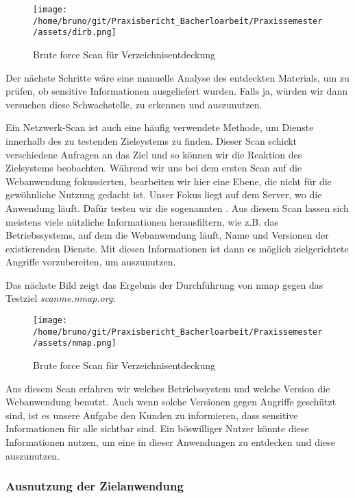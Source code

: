 \begin{figure}[H]
    \centering
    \texttt{[image: /home/bruno/git/Praxisbericht\_Bacherloarbeit/Praxissemester/assets/dirb.png]}
    \caption{Brute force Scan für Verzeichnisentdeckung}
    \centering
\end{figure}

Der nächste Schritte wäre eine manuelle Analyse des entdeckten Materials, um zu prüfen, ob sensitive Informationen ausgeliefert wurden. Falls ja, würden wir dann versuchen diese \gls{Schwachstelle}, zu erkennen und auszunutzen.

Ein Netzwerk-Scan ist auch eine häufig verwendete Methode, um Dienste innerhalb des zu testenden Zielsystems zu finden. Dieser Scan schickt verschiedene Anfragen an das Ziel und so können wir die Reaktion des Zielsystems beobachten. Während wir uns bei dem ersten Scan auf die Webanwendung fokussierten, bearbeiten wir hier eine Ebene, die nicht für die gewöhnliche Nutzung gedacht ist. Unser Fokus liegt auf dem Server, wo die Anwendung läuft. Dafür testen wir die sogenannten . Aus diesem Scan lassen sich meistens viele nützliche Informationen herausfiltern, wie z.B. das Betriebssystems, auf dem die Webanwendung läuft, Name und Versionen der existierenden Dienste. Mit diesen Informationen ist dann es möglich zielgerichtete Angriffe vorzubereiten, um  auszunutzen.

Das nächste Bild zeigt das Ergebnis der Durchführung von \gls{nmap} gegen das Testziel \textit{scanme.nmap.org}:

\begin{figure}[H]
    \centering
    \texttt{[image: /home/bruno/git/Praxisbericht\_Bacherloarbeit/Praxissemester/assets/nmap.png]}
    \caption{Brute force Scan für Verzeichnisentdeckung}
    \centering
\end{figure}

Aus diesem Scan erfahren wir welches Betriebssystem und welche Version die Webanwendung benutzt. Auch wenn solche Versionen gegen Angriffe geschützt sind, ist es unsere Aufgabe den Kunden zu informieren, dass sensitive Informationen für alle sichtbar sind. Ein böswilliger Nutzer könnte diese Informationen nutzen, um eine  in dieser Anwendungen zu entdecken und diese auszunutzen.

\subsubsection{Ausnutzung der Zielanwendung}

